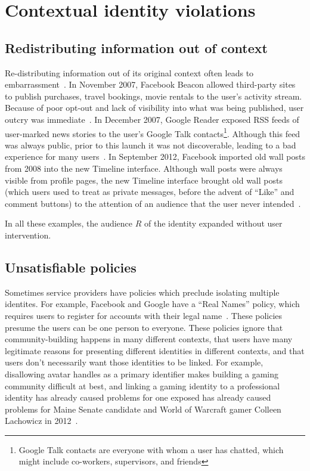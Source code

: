 \documentclass{llncs}
\begin{document}
\section{Contextual identity violations}
\label{sec:examples}
\subsection{Redistributing information out of context}
Re-distributing information out of its original context often leads to
embarrassment~\cite{nissenbaum}.  In November 2007, Facebook Beacon allowed
third-party sites to publish purchases, travel bookings, movie rentals to the
user's activity stream.  Because of poor opt-out and lack of visibility into
what was being published, user outcry was immediate~\cite{mccarthy,nakashima}.
In December 2007, Google Reader exposed RSS feeds of user-marked news stories
to the user's Google Talk contacts\footnote{Google Talk contacts are everyone
with whom a user has chatted, which might include co-workers, supervisors, and
friends}. Although this feed was always public, prior to this launch it was not
discoverable, leading to a bad experience for many users~\cite{helft}. In
September 2012, Facebook imported old wall posts from 2008 into the new
Timeline interface.  Although wall posts were always visible from profile
pages, the new Timeline interface brought old wall posts (which users used to
treat as private messages, before the advent of ``Like'' and comment buttons)
to the attention of an audience that the user never intended~\cite{timeline}.

In all these examples, the audience $R$ of the identity expanded without user
intervention.

\subsection{Unsatisfiable policies}
Sometimes service providers have policies which preclude isolating multiple
identites. For example, Facebook and Google have a ``Real Names'' policy, which
requires users to register for accounts with their legal
name~\cite{fb_names,google_names}.  These policies presume the users can be one
person to everyone. These policies ignore that community-building happens in
many different contexts, that users have many legitimate reasons for presenting
different identities in different contexts, and that users don't necessarily
want those identities to be linked. For example, disallowing avatar handles as
a primary identifier makes building a gaming community difficult at best, and
linking a gaming identity to a professional identity has already caused
problems for one exposed has already caused problems for Maine Senate candidate
and World of Warcraft gamer Colleen Lachowicz in 2012~\cite{maine}.
\end{document}
